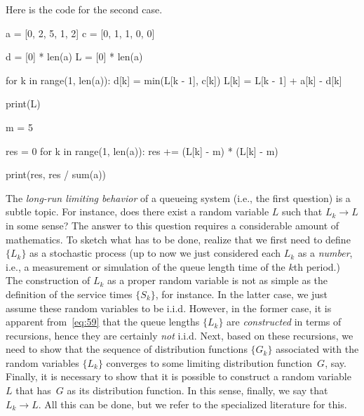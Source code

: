 \begin{exercise}
\begin{solution}
Here is the code for the second case. 
\begin{pyconsole}
a = [0, 2, 5, 1, 2]
c = [0, 1, 1, 0, 0]

d = [0] * len(a)
L = [0] * len(a)

for k in range(1, len(a)):
    d[k] = min(L[k - 1], c[k])
    L[k] = L[k - 1] + a[k] - d[k]

print(L)

m = 5

res = 0
for k in range(1, len(a)):
    res += (L[k] - m) * (L[k] - m)

print(res, res / sum(a))
\end{pyconsole}

\end{solution}
\end{exercise}



\begin{remark}\label{rem:em-1}
The \emph{long-run limiting behavior} of a queueing system (i.e., the first question) is a subtle topic.
For instance, does there exist a random variable $L$ such that $L_k\to L$ in some sense?
The answer to this question requires a considerable amount of mathematics.
To sketch what has to be done, realize that we first need to define $\{L_k\}$ as a stochastic process (up to now we just considered each $L_k$ as a \emph{number}, i.e., a measurement or simulation of the queue length time of the $k$th period.)
The construction of $L_k$ as a proper random variable is not as simple as the definition of the service times  $\{S_k\}$, for instance.
In the latter case, we just assume these random variables to be i.i.d.
However, in the former case, it is apparent from~\cref{eq:59} that the queue lengths $\{L_k\}$ are \emph{constructed} in terms of recursions, hence they are certainly \emph{not} i.i.d.
Next, based on these recursions, we need to show that the sequence of distribution functions $\{G_k\}$ associated with the random variables $\{L_k\}$ converges to some limiting distribution function~$G$, say.
Finally, it is necessary to show that it is possible to construct a random variable~$L$ that has~$G$ as its distribution function.
In this sense, finally,  we say that~$L_k \to L$. All this can be done, but we refer to the specialized literature for this. 
\end{remark}




 



